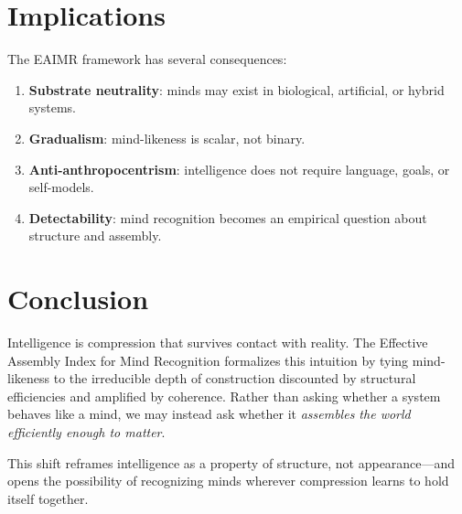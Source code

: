 \documentclass[11pt,letterpaper]{article}
\begin{document}
\section{Implications}

The EAIMR framework has several consequences:
\begin{enumerate}
  \item \textbf{Substrate neutrality}: minds may exist in biological, artificial, or hybrid systems.
  \item \textbf{Gradualism}: mind-likeness is scalar, not binary.
  \item \textbf{Anti-anthropocentrism}: intelligence does not require language, goals, or self-models.
  \item \textbf{Detectability}: mind recognition becomes an empirical question about structure and assembly.
\end{enumerate}

\section{Conclusion}

Intelligence is compression that survives contact with reality. The Effective Assembly Index for Mind Recognition formalizes this intuition by tying mind-likeness to the irreducible depth of construction discounted by structural efficiencies and amplified by coherence. Rather than asking whether a system behaves like a mind, we may instead ask whether it \emph{assembles the world efficiently enough to matter}.

This shift reframes intelligence as a property of structure, not appearance—and opens the possibility of recognizing minds wherever compression learns to hold itself together.
\end{document}
